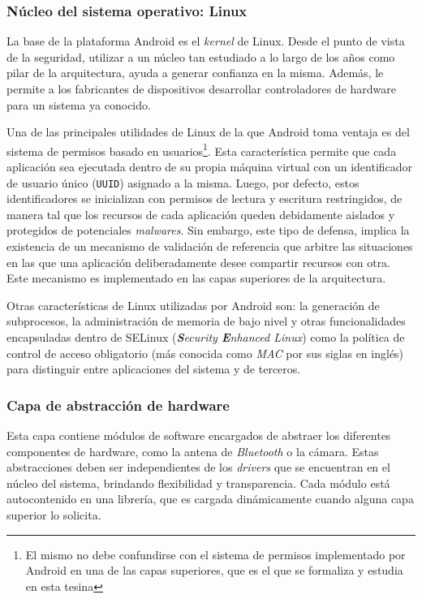 \subsubsection*{Núcleo del sistema operativo: Linux}
\label{section:architecture:kernel}
La base de la plataforma Android es el \textit{kernel} de Linux. Desde el punto de vista de la
seguridad, utilizar a un núcleo tan estudiado a lo largo de los años como pilar de la arquitectura,
ayuda a generar confianza en la misma. Además, le permite a los fabricantes de dispositivos
desarrollar controladores de hardware para un sistema ya conocido.

Una de las principales utilidades de Linux de la que Android toma ventaja es del sistema de permisos
basado en usuarios\footnote{El mismo no debe confundirse con el sistema de permisos implementado por
    Android en una de las capas superiores, que es el que se formaliza y estudia en esta tesina}. Esta
característica permite que cada aplicación sea ejecutada dentro de su propia máquina virtual con un
identificador de usuario único (\texttt{UUID}) asignado a la misma. Luego, por defecto, estos
identificadores se inicializan con permisos de lectura y escritura restringidos, de manera tal que
los recursos de cada aplicación queden debidamente aislados y protegidos de potenciales
\textit{malwares}. Sin embargo, este tipo de defensa, implica la existencia de un mecanismo de
validación de referencia que arbitre las situaciones en las que una aplicación deliberadamente desee
compartir recursos con otra. Este mecanismo es implementado en las capas superiores de la
arquitectura.

Otras características de Linux utilizadas por Android son: la generación de subprocesos, la
administración de memoria de bajo nivel y otras funcionalidades encapsuladas dentro de SELinux
(\textit{\textbf{S}ecurity \textbf{E}nhanced Linux}) como la política de control de acceso
obligatorio (más conocida como \textit{MAC} por sus siglas en inglés) para distinguir entre
aplicaciones del sistema y de terceros.

\subsubsection*{Capa de abstracción de hardware}
Esta capa contiene módulos de software encargados de abstraer los diferentes componentes de
hardware, como la antena de \textit{Bluetooth} o la cámara. Estas abstracciones deben ser
independientes de los \textit{drivers} que se encuentran en el núcleo del sistema, brindando
flexibilidad y transparencia. Cada módulo está autocontenido en una librería, que es cargada
dinámicamente cuando alguna capa superior lo solicita.

